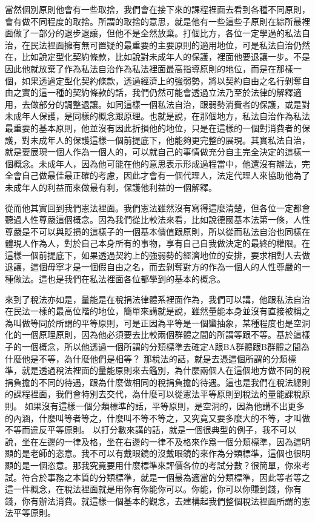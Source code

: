 \documentclass[oneside,sub3section]{ctexbook}
\begin{document}
當然個別原則他會有一些取捨，我們會在接下來的課程裡面去看到各種不同原則，會有做不同程度的取捨。所謂的取捨的意思，就是他有一些這些子原則在綜所最裡面做了一部分的退步退讓，但他不是全然放棄。打個比方，各位一定學過的私法自治，在民法裡面擁有無可置疑的最重要的主要原則的適用地位，可是私法自治仍然在，比如說定型化契約條款，比如說對未成年人的保護，裡面他要退讓一步。不是因此他就放棄了作為私法自治作為私法裡面最高指導原則的地位，而是在那樣一個，如果透過定型化契約條款，透過經濟上的強弱勢，將以契約自由之名行剝奪自由之實的這一種的契約條款的話，我們仍然可能會透過立法乃至於法律的解釋適用，去做部分的調整退讓。如同這樣一個私法自治，跟弱勢消費者的保護，或是對未成年人保護，是同樣的概念跟原理。也就是說，在那個地方，私法自治作為私法最重要的基本原則，他並沒有因此折損他的地位，只是在這樣的一個對消費者的保護，對未成年人的保護這樣一個前提底下，他能夠更完整的展現。其實私法自治，就是要展現一個人作為一個人的，可以就自己的事情做充分自主完全決定的這樣一個概念。未成年人，因為他可能在他的意思表示形成過程當中，他還沒有辦法，完全會自己做最佳最正確的考慮，因此才會有一個代理人，法定代理人來協助他為了未成年人的利益而來做最有利，保護他利益的一個解釋。

從而他其實回到我們憲法裡面。我們憲法雖然沒有寫得這麼清楚，但各位一定都會聽過人性尊嚴這個概念。因為我們從比較法來看，比如說德國基本法第一條，人性尊嚴是不可以與貶損的這樣子的一個基本價值跟原則，所以從而私法自治也同樣在體現人作為人，對於自己本身所有的事物，享有自己自我做決定的最終的權限。在這樣一個前提底下，如果透過契約上的強弱勢的經濟地位的安排，要求相對人去做退讓，這個毋寧才是一個假自由之名，而去剝奪對方的作為一個人的人性尊嚴的一種做法。這也是我們在私法裡面各位都學到的基本的概念。

來到了稅法亦如是，量能是在稅捐法律體系裡面作為，我們可以講，他跟私法自治在民法一樣的最高位階的地位，簡單來講就是說，雖然量能本身並沒有直接被稱之為叫做等同於所謂的平等原則，可是正因為平等是一個蠻抽象，某種程度也是空洞化的一個原理原則，因為他必須要去比較兩個群體之間的所謂等跟不等。基於這樣子的一個概念，所以他透過一個所謂的分類標準去確定A跟BA群體跟B群體之間為什麼他是不等，為什麼他們是相等？ 那稅法的話，就是去憑這個所謂的分類標準，就是透過稅法裡面的量能原則來去鑑別，為什麼兩個人在這個地方做不同的稅捐負擔的不同的待遇，跟為什麼做相同的稅捐負擔的待遇。這也是我們在稅法總則的課程裡面，我們會特別去交代，為什麼可以從憲法平等原則到稅法的量能課稅原則。
如果沒有這樣一個分類標準的話，平等原則，是空洞的，因為他講不出更多的內涵，什麼叫等者等之，什麼叫不等不等之，又究竟又要多麼大的不等，才叫做不等而違反平等原則。
以打分數來講的話，就是一個很典型的例子，我不可以說，坐在左邊的一律及格，坐在右邊的一律不及格來作爲一個分類標準，因為這明顯的是老師的恣意。我不可以有戴眼鏡的沒戴眼鏡的來作為分類標準，這個也很明顯的是一個恣意。那我究竟要用什麼標準來評價各位的考試分數？很簡單，你來考試。符合於事務之本質的分類標準，就是一個最為適當的分類標準，因此等者等之這一件概念，在稅法裡面就是用你有你能你可以。你能，你可以你賺到錢，你有錢，你有辦法消費。就這樣一個基本的觀念，去建構起我們整個稅法裡面所謂的憲法平等原則。
\end{document}
